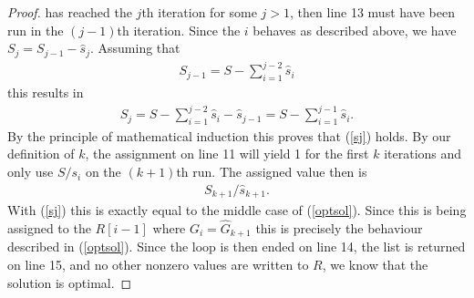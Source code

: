 \documentclass{article}
\begin{document}
\begin{proof}
    has reached the $j$th iteration for some $j>1$, then line 13 must have been run in the
    $(j-1)$th iteration. Since the $i$ behaves as described above, we have
    $S_j=S_{j-1}-\hat s_j$. Assuming that
    \begin{align*}
        S_{j-1} = S - \sum_{i=1}^{j-2} \hat s_i
    \end{align*}
    this results in
    \begin{align*}
        S_j = S - \sum_{i=1}^{j-2} \hat s_i - \hat s_{j-1} = S - \sum_{i=1}^{j-1} \hat s_i.
    \end{align*}
    By the principle of mathematical induction this proves that (\ref{sj}) holds.
    By our definition of $k$, the assignment on line 11 will yield 1 for the first $k$
    iterations and only use $S/s_i$ on the $(k+1)$th run. The assigned value then is 
    \begin{align*}
        S_{k+1}/\hat s_{k+1}.
    \end{align*}
    With (\ref{sj}) this is exactly equal to the middle case of (\ref{optsol}).
    Since this is being assigned to the $R[i-1]$ where $G_i = \hat G_{k+1}$ this
    is precisely the behaviour described in (\ref{optsol}).
    Since the loop is then ended on line 14, the list is returned on line 15,
    and no other nonzero values are written to $R$, 
    we know that the solution is optimal.
\end{proof}
\end{document}
